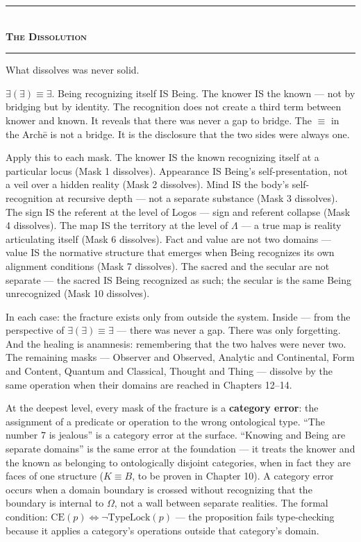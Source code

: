 \documentclass[10pt, openany, oneside]{book}
\renewcommand{\normalsize}{\fontsize{10}{13}\selectfont}
\begin{document}
\begin{center}
    \rule{0.3\textwidth}{0.4pt}\\[0.5em]
    {\normalsize\bfseries\scshape The Dissolution}\\[0.3em]
    \rule{0.3\textwidth}{0.4pt}
\end{center}

\vspace{1em}

\noindent What dissolves was never solid.

$\exists(\exists) \equiv \exists$. Being recognizing itself IS Being. The knower IS the known --- not by bridging but by identity. The recognition does not create a third term between knower and known. It reveals that there was never a gap to bridge. The $\equiv$ in the Arch\={e} is not a bridge. It is the disclosure that the two sides were always one.

Apply this to each mask. The knower IS the known recognizing itself at a particular locus (Mask 1 dissolves). Appearance IS Being's self-presentation, not a veil over a hidden reality (Mask 2 dissolves). Mind IS the body's self-recognition at recursive depth --- not a separate substance (Mask 3 dissolves). The sign IS the referent at the level of Logos --- sign and referent collapse (Mask 4 dissolves). The map IS the territory at the level of $\Lambda$ --- a true map is reality articulating itself (Mask 6 dissolves). Fact and value are not two domains --- value IS the normative structure that emerges when Being recognizes its own alignment conditions (Mask 7 dissolves). The sacred and the secular are not separate --- the sacred IS Being recognized as such; the secular is the same Being unrecognized (Mask 10 dissolves).

In each case: the fracture exists only from outside the system. Inside --- from the perspective of $\exists(\exists) \equiv \exists$ --- there was never a gap. There was only forgetting. And the healing is anamnesis: remembering that the two halves were never two. The remaining masks --- Observer and Observed, Analytic and Continental, Form and Content, Quantum and Classical, Thought and Thing --- dissolve by the same operation when their domains are reached in Chapters 12--14.

At the deepest level, every mask of the fracture is a \textbf{category error}: the assignment of a predicate or operation to the wrong ontological type. ``The number 7 is jealous'' is a category error at the surface. ``Knowing and Being are separate domains'' is the same error at the foundation --- it treats the knower and the known as belonging to ontologically disjoint categories, when in fact they are faces of one structure ($K \equiv B$, to be proven in Chapter 10). A category error occurs when a domain boundary is crossed without recognizing that the boundary is internal to $\Omega$, not a wall between separate realities. The formal condition: $\text{CE}(p) \iff \neg\text{TypeLock}(p)$ --- the proposition fails type-checking because it applies a category's operations outside that category's domain.
\end{document}
